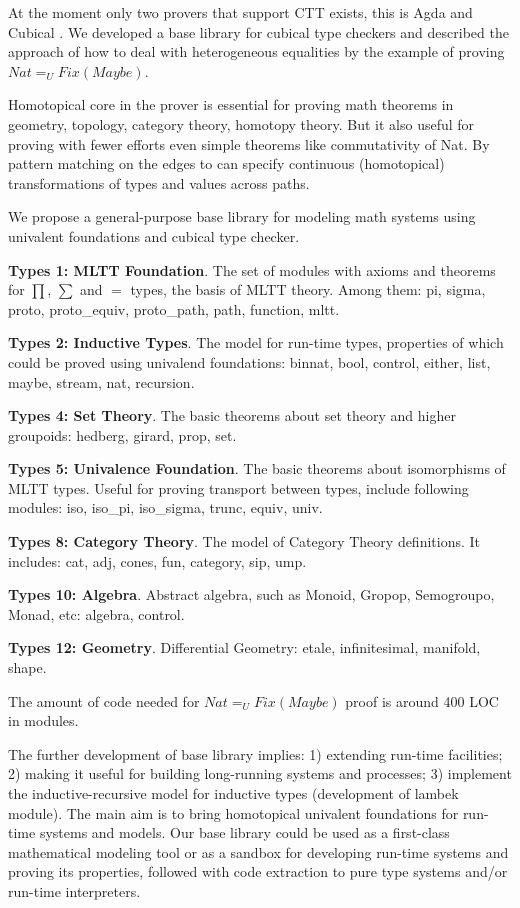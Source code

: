 \documentclass{article}
\begin{document}
At the moment only two provers that support CTT exists, this is Agda \cite{Ulf09} and Cubical \cite{Mortberg17}.
We developed a base library for cubical type checkers and described the approach
of how to deal with heterogeneous equalities by the example of proving $Nat =_U Fix(Maybe)$.

Homotopical core in the prover is essential for proving math theorems in geometry,
topology, category theory, homotopy theory. But it also useful
for proving with fewer efforts even simple theorems like commutativity of Nat. By pattern matching
on the edges to can specify continuous (homotopical) transformations of types
and values across paths.

We propose a general-purpose base library for modeling math systems using univalent foundations
and cubical type checker.

{\bf Types 1: MLTT Foundation}.
The set of modules with axioms and theorems for $\prod$, $\sum$ and $=$ types,
the basis of MLTT theory. Among them: pi, sigma, proto, proto\_equiv,
proto\_path, path, function, mltt.

{\bf Types 2: Inductive Types}.
The model for run-time types, properties of which could be proved using
univalend foundations: binnat, bool, control, either, list,
maybe, stream, nat, recursion.

{\bf Types 4: Set Theory}.
The basic theorems about set theory and higher groupoids: hedberg, girard, prop, set.

{\bf Types 5: Univalence Foundation}.
The basic theorems about isomorphisms of MLTT types. Useful for
proving transport between types, include following modules:
iso, iso\_pi, iso\_sigma, trunc, equiv, univ.

{\bf Types 8: Category Theory}.
The model of Category Theory \cite{HoTT} definitions. It includes:
cat, adj, cones, fun, category, sip, ump.

{\bf Types 10: Algebra}.
Abstract algebra, such as Monoid, Gropop, Semogroupo, Monad, etc: algebra, control.

{\bf Types 12: Geometry}.
Differential Geometry: etale, infinitesimal, manifold, shape.

The amount of code needed for $Nat =_U Fix(Maybe)$ proof is around 400 LOC in modules.

The further development of base library implies:
1) extending run-time facilities;
2) making it useful for building long-running systems and processes;
3) implement the inductive-recursive model for inductive types (development of lambek module).
The main aim is to bring homotopical univalent foundations for run-time systems and models.
Our base library could be used as a first-class mathematical modeling tool or as a sandbox
for developing run-time systems and proving its properties, followed with code extraction
to pure type systems and/or run-time interpreters.



\end{document}

